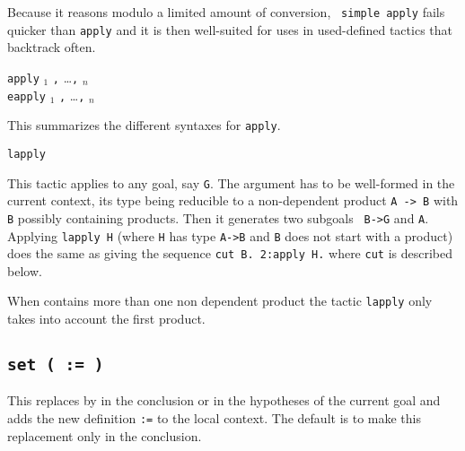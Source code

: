 \begin{Variants}
  Because it reasons modulo a limited amount of conversion, {\tt
  simple apply} fails quicker than {\tt apply} and it is then
  well-suited for uses in used-defined tactics that backtrack often.

\item {} {\tt apply} {\term$_1$}  {\tt ,} \ldots {\tt ,} {\term$_n$} \\
   {\tt eapply} {\term$_1$}  {\tt ,} \ldots {\tt ,} {\term$_n$} 

  This summarizes the different syntaxes for {\tt apply}.

\item {\tt lapply {\term}}  

  This tactic applies to any goal, say {\tt G}.  The argument {\term}
  has to be well-formed in the current context, its type being
  reducible to a non-dependent product {\tt A -> B} with {\tt B}
  possibly containing products. Then it generates two subgoals {\tt
  B->G} and {\tt A}. Applying {\tt lapply H} (where {\tt H} has type
  {\tt A->B} and {\tt B} does not start with a product) does the same
  as giving the sequence {\tt cut B. 2:apply H.} where {\tt cut} is
  described below.

  \Warning When {\term} contains more than one non
  dependent product the tactic {\tt lapply} only takes into account the
  first product.

\end{Variants}

\subsection{{\tt set ( {\ident} {\tt :=} {\term} \tt )}
\label{tactic:set}
}

This replaces {\term} by {\ident} in the conclusion or in the
hypotheses of the current goal and adds the new definition {\ident
{\tt :=} \term} to the local context. The default is to make this
replacement only in the conclusion.

